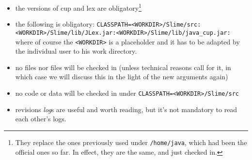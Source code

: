 \begin{itemize}
\item the  versions of cup and lex are
  obligatory\footnote{They replace the ones previously used under
    \texttt{/home/java}, which had been the official ones so far. In
    effect, they are the same, and just checked in.}
\item the following  is obligatory:
  \texttt{CLASSPATH=<WORKDIR>/Slime/src:<WORKDIR>/Slime/lib/JLex.jar:<WORKDIR>/Slime/lib/java_cup.jar:}
  where of course the \texttt{<WORKDIR>} is a placeholder and it has to be
  adapted by the individual user to his work directory.
\item no  files nor  files will be
  checked in (unless technical reasons call for it, in which case we will
  discuss this in the light of the new arguments again)
\item no  code or data will be checked in under
  \texttt{CLASSPATH=<WORKDIR>/Slime/src}
\item revisions \emph{log}s are useful and worth reading, but it's not
  mandatory to read each other's logs.
\end{itemize}
\fi


